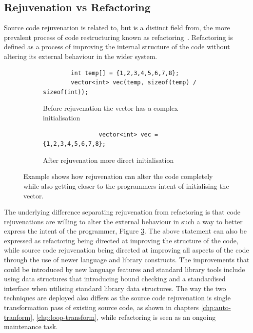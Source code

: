 \documentclass[bsc,frontabs,singlespacing,twoside,parskip,deptreport]{infthesis}
\begin{document}
\subsection{Rejuvenation vs Refactoring}\label{sec:rejuv-vs-refact}

Source code rejuvenation is related to, but is a distinct field from, the more prevalent process of code restructuring known as refactoring~\cite{REFACTOR_BOOK}. Refactoring is defined as a process of improving the internal structure of the code without altering its external behaviour in the wider system. 

\begin{figure}[H]
    
    \begin{subfigure}[h]{\textwidth}
        \begin{verbatim}
        int temp[] = {1,2,3,4,5,6,7,8};
        vector<int> vec(temp, sizeof(temp) / sizeof(int));
        \end{verbatim}
        \caption{Before rejuvenation the vector has a complex initialisation}
        \vspace{0.2cm}
        \label{fig:exp-intent-before}
    \end{subfigure}
    
    \begin{subfigure}[h]{\textwidth}
        \centering
        \begin{verbatim}
                vector<int> vec = {1,2,3,4,5,6,7,8};
        \end{verbatim}
        \caption{After rejuvenation more direct initialisation}
        \label{fig:exp-intent-after}
    \end{subfigure}

    \caption{Example shows how rejuvenation can alter the code completely while also getting closer to the programmers intent of initialising the vector.}
    \label{fig:exp-intent}
\end{figure}

The underlying difference separating rejuvenation from refactoring is that code rejuvenations are willing to alter the external behaviour in such a way to better express the intent of the programmer, Figure \ref{fig:exp-intent}. The above statement can also be expressed as refactoring being directed at improving the structure of the code, while source code rejuvenation being directed at improving all aspects of the code through the use of newer language and library constructs. The improvements that could be introduced by new language features and standard library tools include using data structures that introducing bound checking and a standardised interface when utilising standard library data structures. The way the two techniques are deployed also differs as the source code rejuvenation is single transformation pass of existing source code, as shown in chapters \ref{chp:auto-tranform}, \ref{chp:loop-transform}, while refactoring is seen as an ongoing maintenance task.
\end{document}
